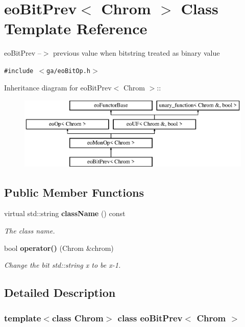 \section{eo\-Bit\-Prev$<$ Chrom $>$ Class Template Reference}
\label{classeo_bit_prev}
eo\-Bit\-Prev --$>$ previous value when bitstring treated as binary value  


{\tt \#include $<$ga/eo\-Bit\-Op.h$>$}

Inheritance diagram for eo\-Bit\-Prev$<$ Chrom $>$::\begin{figure}[H]
\begin{center}
\leavevmode
\includegraphics[height=3.50548cm]{classeo_bit_prev}
\end{center}
\end{figure}
\subsection*{Public Member Functions}
\begin{CompactItemize}
\item 
virtual std::string {\bf class\-Name} () const \label{classeo_bit_prev_a0}

\begin{CompactList}\small\item\em The class name. \item\end{CompactList}\item 
bool {\bf operator()} (Chrom \&chrom)
\begin{CompactList}\small\item\em Change the bit std::string x to be x-1. \item\end{CompactList}\end{CompactItemize}


\subsection{Detailed Description}
\subsubsection*{template$<$class Chrom$>$ class eo\-Bit\-Prev$<$ Chrom $>$}

